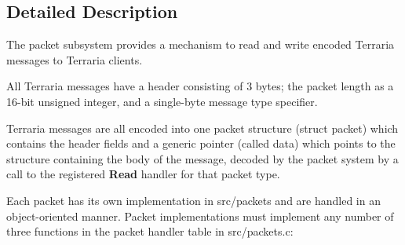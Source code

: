 \subsection{Detailed Description}
The packet subsystem provides a mechanism to read and write encoded Terraria messages to Terraria clients. 

All Terraria messages have a header consisting of 3 bytes; the packet length as a 16-\/bit unsigned integer, and a single-\/byte message type specifier.

Terraria messages are all encoded into one packet structure ({\ttfamily struct packet}) which contains the header fields and a generic pointer (called {\ttfamily data}) which points to the structure containing the body of the message, decoded by the packet system by a call to the registered {\bfseries Read} handler for that packet type.

Each packet has its own implementation in {\ttfamily src/packets} and are handled in an object-\/oriented manner. Packet implementations must implement any number of three functions in the packet handler table in {\ttfamily src/packets.\+c}\+:

